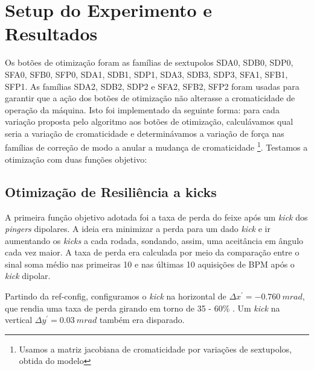 \documentclass[a4paper,
               keeplastbox,   %
               ]{jacow}
\begin{document}
\section{Setup do Experimento e Resultados}
Os botões de otimização foram as famílias de sextupolos SDA0, SDB0, SDP0, SFA0, SFB0, SFP0, SDA1, SDB1, SDP1, SDA3, SDB3, SDP3, SFA1, SFB1, SFP1. As famílias SDA2, SDB2, SDP2 e SFA2, SFB2, SFP2 foram usadas para garantir que a ação dos botões de otimização não alterasse a cromaticidade de operação da máquina. Isto foi implementado da seguinte forma: para cada variação proposta pelo algoritmo aos botões de otimização, calculávamos qual seria a variação de cromaticidade e determinávamos a variação de força nas famílias de correção de modo a anular a mudança de cromaticidade \footnote{Usamos a matriz jacobiana de cromaticidade por variações de sextupolos, obtida do modelo}. 
Testamos a otimização com duas funções objetivo:
\subsection{Otimização de Resiliência a kicks}
A primeira função objetivo adotada foi a taxa de perda do feixe após um \textit{kick} dos \textit{pingers} dipolares. A ideia era minimizar a perda para um dado \textit{kick} e ir aumentando os \textit{kicks} a cada rodada, sondando, assim, uma aceitância em ângulo cada vez maior. %
A taxa de perda era calculada por meio da comparação entre o sinal soma médio nas primeiras 10 e nas últimas 10 aquisições de BPM após o \textit{kick} dipolar.

Partindo da ref-config, configuramos o \textit{kick} na horizontal de $\Delta x^\prime = -0.760~ \unit{m rad}$, que rendia uma taxa de perda girando em torno de 35 - 60\% . Um \textit{kick} na vertical $\Delta y^\prime = 0.03~\unit{m rad}$ também era disparado.
\end{document}
